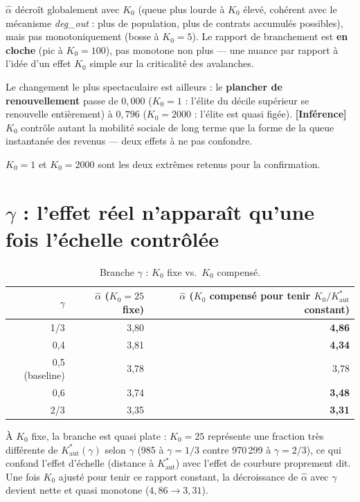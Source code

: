 \documentclass[11pt,a4paper]{article}
\newcommand{\Kaut}{K^{*}_{\mathrm{aut}}}
\newcommand{\inference}{\textbf{[Inférence]}}
\begin{document}
$\hat\alpha$ décroît globalement avec $K_0$ (queue plus lourde à $K_0$
élevé, cohérent avec le mécanisme \emph{deg\_out} : plus de population,
plus de contrats accumulés possibles), mais pas monotoniquement (bosse
à $K_0=5$). Le rapport de branchement est \textbf{en cloche} (pic à
$K_0=100$), pas monotone non plus --- une nuance par rapport à l'idée
d'un effet $K_0$ simple sur la criticalité des avalanches.

Le changement le plus spectaculaire est ailleurs : le \textbf{plancher
de renouvellement} passe de $0{,}000$ ($K_0=1$ : l'élite du décile
supérieur se renouvelle entièrement) à $0{,}796$ ($K_0=2000$ : l'élite
est quasi figée). \inference{} $K_0$ contrôle autant la mobilité
sociale de long terme que la forme de la queue instantanée des revenus
--- deux effets à ne pas confondre.

$K_0=1$ et $K_0=2000$ sont les deux extrêmes retenus pour la
confirmation.

\section{$\gamma$ : l'effet réel n'apparaît qu'une fois l'échelle
contrôlée}
\label{sec:gamma}

\begin{table}[h]
\centering
\begin{tabular}{@{}rrr@{}}
\toprule
$\gamma$ & $\hat\alpha$ ($K_0=25$ fixe) & $\hat\alpha$ ($K_0$ compensé pour tenir $K_0/\Kaut$ constant) \\
\midrule
1/3          & 3{,}80 & \textbf{4{,}86} \\
0{,}4        & 3{,}81 & \textbf{4{,}34} \\
0{,}5 (baseline) & 3{,}78 & 3{,}78 \\
0{,}6        & 3{,}74 & \textbf{3{,}48} \\
2/3          & 3{,}35 & \textbf{3{,}31} \\
\bottomrule
\end{tabular}
\caption{Branche $\gamma$ : $K_0$ fixe vs.\ $K_0$ compensé.}
\end{table}

À $K_0$ fixe, la branche est quasi plate : $K_0=25$ représente une
fraction très différente de $\Kaut(\gamma)$ selon $\gamma$ (985 à
$\gamma=1/3$ contre 970\,299 à $\gamma=2/3$), ce qui confond l'effet
d'échelle (distance à $\Kaut$) avec l'effet de courbure proprement dit.
Une fois $K_0$ ajusté pour tenir ce rapport constant, la décroissance
de $\hat\alpha$ avec $\gamma$ devient nette et quasi monotone
($4{,}86 \to 3{,}31$).
\end{document}
